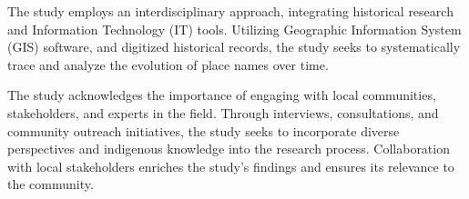 The study employs an interdisciplinary approach, integrating historical research and Information Technology (IT) tools. Utilizing Geographic Information System (GIS) software, and digitized historical records, the study seeks to systematically trace and analyze the evolution of place names over time.


The study acknowledges the importance of engaging with local communities, stakeholders, and experts in the field. Through interviews, consultations, and community outreach initiatives, the study seeks to incorporate diverse perspectives and indigenous knowledge into the research process. Collaboration with local stakeholders enriches the study's findings and ensures its relevance to the community.



